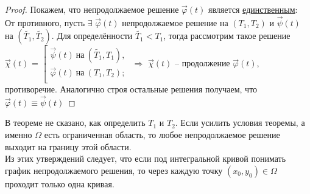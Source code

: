 \begin{proof}
    Покажем, что непродолжаемое решение $\vec{\varphi}(t)$ является \underline{единственным}:\\
    От противного, пусть $\exists$ $\vec{\varphi}(t)$ непродолжаемое решение на $(T_1, T_2)$ и $\vec{\psi}(t)$ на $(\widetilde{T_1}, \widetilde{T_2})$. Для определённости $\widetilde{T_1} < T_1$, тогда рассмотрим такое решение
    $\vec{\chi}(t)$ = 
    $\left[ 
        \begin{gathered} 
            \vec{\psi}(t)\ \text{на}\ (\widetilde{T_1}, T_1), \\ 
            \vec{\varphi}(t)\ \text{на}\ (T_1, T_2); \\ 
        \end{gathered} 
    \right.$
    $\Rightarrow$ $\vec{\chi}(t)$  -- продолжение $\vec{\varphi}(t)$, противоречие. Аналогично строя остальные решения получаем, что $\vec{\varphi}(t) \equiv \vec{\psi}(t)$ 
\end{proof}

\begin{remark}
    В теореме не сказано, как определить $T_1$ и $T_2$. Если усилить условия теоремы, а именно $\Omega$ есть ограниченная область, то любое непродолжаемое решение выходит на границу этой области.\\
    Из этих утверждений следует, что если под интегральной кривой понимать график непродолжаемого решения, то через каждую точку $(x_0, y_0) \in \Omega$ проходит только одна кривая.
\end{remark}

